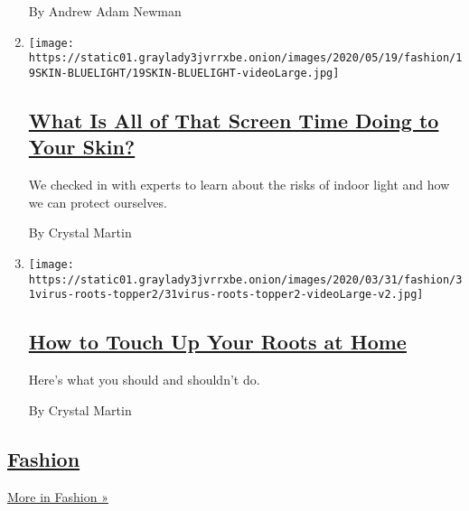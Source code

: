 \begin{enumerate}
  By Andrew Adam Newman
\item
  \texttt{[image: https://static01.graylady3jvrrxbe.onion/images/2020/05/19/fashion/19SKIN-BLUELIGHT/19SKIN-BLUELIGHT-videoLarge.jpg]}

  \hypertarget{what-is-all-of-that-screen-time-doing-to-your-skin}{%
  \subsection{\texorpdfstring{\href{/2020/05/20/style/skin-damage-blue-light-what-is-all-of-that-screen-time-doing-to-your-skin.html}{What
  Is All of That Screen Time Doing to Your
  Skin?}}{What Is All of That Screen Time Doing to Your Skin?}}\label{what-is-all-of-that-screen-time-doing-to-your-skin}}

  We checked in with experts to learn about the risks of indoor light
  and how we can protect ourselves.

  By Crystal Martin
\item
  \texttt{[image: https://static01.graylady3jvrrxbe.onion/images/2020/03/31/fashion/31virus-roots-topper2/31virus-roots-topper2-videoLarge-v2.jpg]}

  \hypertarget{how-to-touch-up-your-roots-at-home}{%
  \subsection{\texorpdfstring{\href{/2020/03/31/style/how-to-touch-up-your-roots-at-home.html}{How
  to Touch Up Your Roots at
  Home}}{How to Touch Up Your Roots at Home}}\label{how-to-touch-up-your-roots-at-home}}

  Here's what you should and shouldn't do.

  By Crystal Martin
\end{enumerate}

\hypertarget{fashion}{%
\subsection{\texorpdfstring{\href{/section/fashion}{Fashion}}{Fashion}}\label{fashion}}

\href{/section/fashion}{More in Fashion »}

